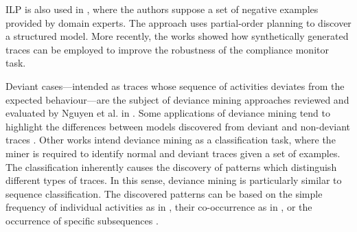 \ac{ILP} is also used in \cite{2006-Ferreira}, where the authors suppose a set of negative examples provided by domain experts. The approach uses partial-order planning to discover a structured model. More recently, the works \cite{2014-Broucke,2014-BrouckePhD} showed how synthetically generated traces can be employed to improve the robustness of the compliance monitor task. 
 
Deviant cases---intended as traces whose sequence of activities deviates from the expected behaviour---are the subject of deviance mining approaches reviewed and evaluated by Nguyen et al. in \cite{2016-Nguyen}. Some applications of deviance mining tend to highlight the differences between models discovered from deviant and non-deviant traces \cite{2014-Suriadi,2014-Armas}. Other works intend deviance mining as a classification task, where the miner is required to identify normal and deviant traces given a set of examples. The classification inherently causes the discovery of patterns which distinguish different types of traces. In this sense, deviance mining is particularly similar to sequence classification. The discovered patterns can be based on the simple frequency of individual activities as in \cite{2013-Suriadi,2015-Partington}, their co-occurrence as in \cite{2011-Swinnen}, or the occurrence of specific subsequences \cite{2013-Bose,2007-Lo,2016-Bernardi}.
 
 
%
%
%
